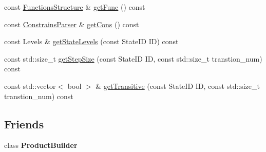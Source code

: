 \begin{DoxyCompactItemize}
\item 
const \hyperlink{class_functions_structure}{Functions\-Structure} \& \hyperlink{class_product_structure_a4cc9c45df361c4ddc5d82fe52900f44d}{get\-Func} () const 
\item 
const \hyperlink{class_constrains_parser}{Constrains\-Parser} \& \hyperlink{class_product_structure_ab858732219ea8059b950f18cf51af0ec}{get\-Cons} () const 
\item 
const Levels \& \hyperlink{class_product_structure_ae55a35958534cebb974d491ff80fedc1}{get\-State\-Levels} (const State\-I\-D I\-D) const 
\item 
const std\-::size\-\_\-t \hyperlink{class_product_structure_a7d6e3abdfee3a5469115f3e4ba76dfd6}{get\-Step\-Size} (const State\-I\-D I\-D, const std\-::size\-\_\-t transtion\-\_\-num) const 
\item 
const std\-::vector$<$ bool $>$ \& \hyperlink{class_product_structure_a0b4ed666548d34270779222d4ae31606}{get\-Transitive} (const State\-I\-D I\-D, const std\-::size\-\_\-t transtion\-\_\-num) const 
\end{DoxyCompactItemize}
\subsection*{Friends}
\begin{DoxyCompactItemize}
\item 
\hypertarget{class_product_structure_a6c45ddd297f18174168e322ae1b74396}{class {\bfseries Product\-Builder}}\label{class_product_structure_a6c45ddd297f18174168e322ae1b74396}

\end{DoxyCompactItemize}


